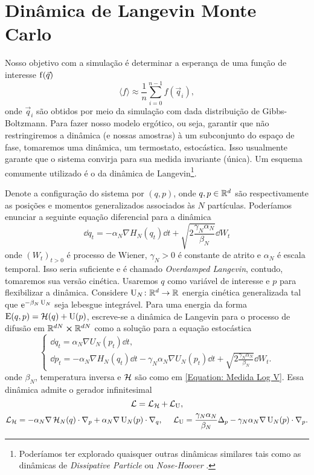 \section{Dinâmica de Langevin Monte Carlo}

Nosso objetivo com a simulação é determinar a esperança de uma função de interesse $\operatorname{f}(\vec{q})$ $$\langle f \rangle \approx \frac{1}{n} \sum_{i=0}^{n-1} f(\vec{q}_i),$$ onde $\vec{q}_i$ são obtidos por meio da simulação com dada distribuição de Gibbs-Boltzmann. Para fazer nosso modelo ergótico, ou seja, garantir que não restringiremos a dinâmica (e nossas amostras) à um subconjunto do espaço de fase, tomaremos uma dinâmica, um termostato, estocástica. Isso usualmente garante que o sistema convirja para sua medida invariante (única). Um esquema comumente utilizado é o da dinâmica de Langevin\footnote{Poderíamos ter explorado quaisquer outras dinâmicas similares tais como as dinâmicas de \textit{Dissipative Particle} \cite{DPD} ou \textit{Nose-Hoover} \cite{Hoover}.}.

Denote a configuração do sistema por $(q, p)$, onde $q,p \in \mathbb{R}^d$ são respectivamente as posições e momentos generalizados associados às $N$ partículas. Poderíamos enunciar a seguinte equação diferencial para a dinâmica
\begin{equation}
	\dd q_t = -\alpha_N \nabla H_N(q_t) \dd t + \sqrt{2\frac{\gamma_N \alpha_N}{\beta_N}} \dd W_t
	\label{Equação: Langevin Overdamped}
\end{equation}
onde $(W_t)_{t>0}$ é processo de Wiener, $\gamma_N > 0$ é constante de atrito e $\alpha_N$ é escala temporal. Isso seria suficiente e é chamado \textit{Overdamped Langevin}, contudo, tomaremos sua versão cinética. Usaremos $q$ como variável de interesse e $p$ para flexibilizar a dinâmica. Considere $\operatorname{U}_N \colon \mathbb{R}^d \rightarrow \mathbb{R}$ energia cinética generalizada tal que $\operatorname{\textrm e}^{-\beta_N \operatorname{U}_N}$ seja lebesgue integrável. Para uma energia da forma $\operatorname{E}(q,p) = \operatorname{\mathcal{H}}(q) + \operatorname{U}(p)$, escreve-se \cite{Stoltz2018} a dinâmica de Langevin para o processo de difusão em $\mathbb{R}^{dN} \cross \mathbb{R}^{dN}$ como a solução para a equação estocástica 
\begin{equation}
\begin{cases}
	\dd q_t = \alpha_N \nabla U_N (p_t) \dd t, \\
	\dd p_t = -\alpha_N \nabla H_N(q_t) \dd t - \gamma_N \alpha_N \nabla U_N(p_t) \dd t + \sqrt{2\frac{\gamma_N \alpha_N}{\beta_N}} \dd W_t.
\end{cases}
\label{Equação: EqDif - Dinamica Langevin}
\end{equation}
onde $\beta_N$, temperatura inversa e $\operatorname{\mathcal{H}}$ são como em \ref{Equation: Medida Log V}. Essa dinâmica admite o gerador infinitesimal 
\[
	\operatorname{\mathcal{L}} = \operatorname{\mathcal{L}}_{\operatorname{\mathcal{H}}} + \operatorname{\mathcal{L}}_{\operatorname{U}},
\]
\[
 \operatorname{\mathcal{L}}_{\operatorname{\mathcal{H}}} = -\alpha_N \nabla\operatorname{\mathcal{H}}_N(q) \cdot \nabla_p + \alpha_N \nabla \operatorname{U}_N(p) \cdot \nabla_q, \ \ \ \ \operatorname{\mathcal{L}}_{\operatorname{U}} = \frac{\gamma_N\alpha_N}{\beta_N} \Delta_p - \gamma_N \alpha_N \nabla \operatorname{U}_N(p) \cdot \nabla_p.
\]

